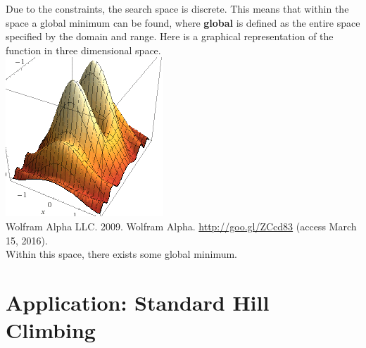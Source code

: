 \documentclass[]{report}
\begin{document}
	Due to the constraints, the search space is discrete. This means that within the space a global minimum can be found, where \textbf{global} is defined as the entire space specified by the domain and range. Here is a graphical representation of the function in three dimensional space.\\
	\fontsize{6}{8}\selectfont
	\includegraphics{hill}\\Wolfram Alpha LLC. 2009. Wolfram Alpha. \url{http://goo.gl/ZCcd83} (access March 15, 2016).\\
	\fontsize{12}{14}\selectfont
	Within this space, there exists some global minimum.

\chapter{Application: Standard Hill Climbing}
\end{document}
